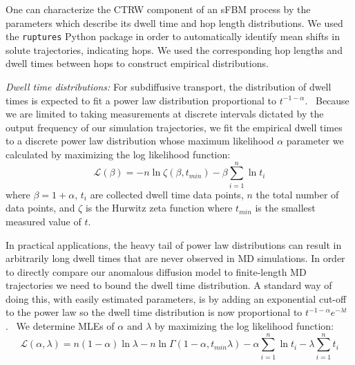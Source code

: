 \documentclass[journal=jctcce,manuscript=article]{achemso}
\begin{document}
  One can characterize the CTRW component of an sFBM process by the parameters
  which describe its dwell time and hop length distributions. We used the
  \texttt{ruptures} Python package in order to automatically identify mean
  shifts in solute trajectories, indicating hops.\cite{truong_ruptures:_2018}
  We used the corresponding hop lengths and dwell times between hops to
  construct empirical distributions.
  
  \textit{Dwell time distributions:} For subdiffusive transport, the distribution 
  of dwell times is expected to fit a power law distribution 
  proportional to $t^{-1-\alpha}$.~\cite{meroz_toolbox_2015}
  Because we are limited to taking measurements at discrete intervals dictated by the output 
  frequency of our simulation trajectories, we fit the empirical dwell times
  to a discrete power law distribution whose maximum likelihood $\alpha$ 
  parameter we calculated by maximizing the log likelihood function: 
  \begin{equation}
	\mathcal{L}(\beta) = -n\ln \zeta(\beta, t_{min}) -
	\beta\sum_{i=1}^{n} \ln t_i 
  \label{eqn:powerlaw_likelihood}
  \end{equation}
  where $\beta = 1 + \alpha$, $t_i$ are collected dwell time data points,
  $n$ the total number of data points, and $\zeta$ is the Hurwitz zeta function
  where $t_{min}$ is the smallest measured value of $t$.~\cite{clauset_power-law_2009}
  
  In practical applications, the heavy tail of power law distributions can result in 
  arbitrarily long dwell times that are never observed in MD simulations. 
  In order to directly compare our anomalous diffusion model to finite-length MD 
  trajectories we need to bound the dwell time distribution. A standard way of 
  doing this, with easily estimated parameters, is by adding an exponential 
  cut-off to the power law so the dwell time distribution is now proportional 
  to $t^{-1 - \alpha}e^{-\lambda t}$.~\cite{newman_power_2005,clauset_power-law_2009}  %
  We determine MLEs of $\alpha$ and $\lambda$ by maximizing the log 
  likelihood function:~\cite{clauset_power-law_2009}
  \begin{equation}
    \mathcal{L}(\alpha, \lambda) = n(1 - \alpha)\ln\lambda - n\ln\Gamma(1 - \alpha, t_{min}\lambda) - \alpha\sum_{i=1}^{n}\ln t_i - \lambda\sum_{i=1}^n t_i
  \label{eqn:powerlaw_cutoff_likelihood}
  \end{equation}
  
\end{document}
